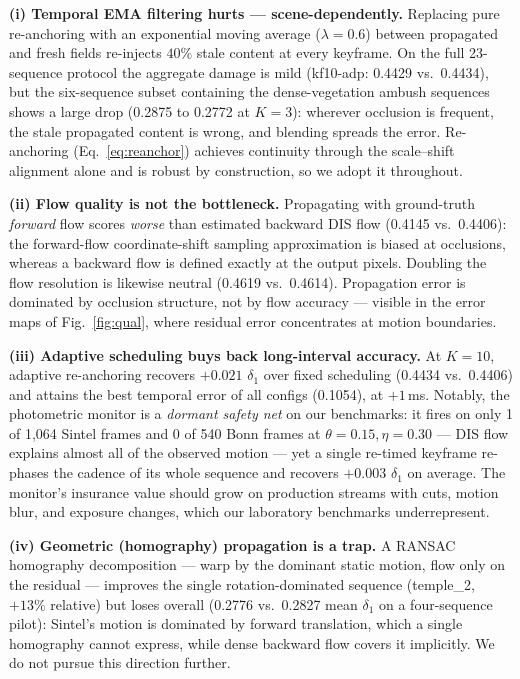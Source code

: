\documentclass[10pt,twocolumn]{article}
\begin{document}
\textbf{(i) Temporal EMA filtering hurts --- scene-dependently.} Replacing
pure re-anchoring with an exponential moving average ($\lambda{=}0.6$)
between propagated and fresh fields re-injects $40\%$ stale content at every
keyframe. On the full 23-sequence protocol the aggregate damage is mild
(kf10-adp: 0.4429 vs.\ 0.4434), but the six-sequence subset containing the
dense-vegetation ambush sequences shows a large drop (0.2875 to 0.2772 at
$K{=}3$): wherever occlusion is frequent, the stale propagated content is
wrong, and blending spreads the error. Re-anchoring (Eq.~\ref{eq:reanchor})
achieves continuity through the scale--shift alignment alone and is robust
by construction, so we adopt it throughout.

\textbf{(ii) Flow quality is not the bottleneck.} Propagating with
ground-truth \emph{forward} flow scores \emph{worse} than estimated backward
DIS flow (0.4145 vs.\ 0.4406): the forward-flow coordinate-shift sampling
approximation is biased at occlusions, whereas a backward flow is defined
exactly at the output pixels. Doubling the flow resolution is likewise
neutral (0.4619 vs.\ 0.4614). Propagation error is dominated by occlusion
structure, not by flow accuracy --- visible in the error maps of
Fig.~\ref{fig:qual}, where residual error concentrates at motion boundaries.

\textbf{(iii) Adaptive scheduling buys back long-interval accuracy.} At
$K{=}10$, adaptive re-anchoring recovers $+0.021$ $\delta_1$ over fixed
scheduling (0.4434 vs.\ 0.4406) and attains the best temporal error of all
configs (0.1054), at $+1$\,ms. Notably, the photometric monitor is a
\emph{dormant safety net} on our benchmarks: it fires on only 1 of 1{,}064
Sintel frames and 0 of 540 Bonn frames at $\theta{=}0.15,\eta{=}0.30$ ---
DIS flow explains almost all of the observed motion --- yet a single
re-timed keyframe re-phases the cadence of its whole sequence and recovers
$+0.003$ $\delta_1$ on average. The monitor's insurance value should grow
on production streams with cuts, motion blur, and exposure changes, which
our laboratory benchmarks underrepresent.

\textbf{(iv) Geometric (homography) propagation is a trap.} A RANSAC
homography decomposition --- warp by the dominant static motion, flow only on
the residual --- improves the single rotation-dominated sequence (temple\_2,
$+13\%$ relative) but loses overall (0.2776 vs.\ 0.2827 mean $\delta_1$ on a
four-sequence pilot): Sintel's motion is dominated by forward translation,
which a single homography cannot express, while dense backward flow covers it
implicitly. We do not pursue this direction further.
\end{document}

